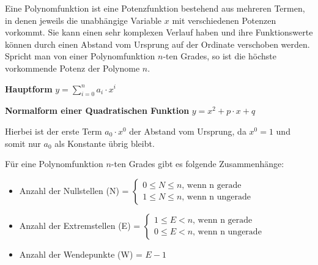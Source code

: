 \begin{figure}[h!]
\centering
\end{figure}


Eine Polynomfunktion ist eine Potenzfunktion bestehend aus mehreren Termen, in denen jeweils die unabh\"{a}ngige Variable $x$ mit verschiedenen Potenzen vorkommt. Sie kann einen sehr komplexen Verlauf haben und ihre Funktionswerte k\"{o}nnen durch einen Abstand vom Ursprung auf der Ordinate verschoben werden.
Spricht man von einer Polynomfunktion $n$-ten Grades, so ist die h\"{o}chste vorkommende Potenz der Polynome $n$.

\textbf{Hauptform}  $y = \sum_{i=0}^{n} a_{i} \cdot x^i$

\textbf{Normalform einer Quadratischen Funktion}  $y = x^2 + p \cdot x + q$

Hierbei ist der erste Term $a_{0} \cdot x^0$ der Abstand vom Ursprung, da $x^0 = 1$ und somit nur $a_{0}$ als Konstante \"{u}brig bleibt.

F\"{u}r eine Polynomfunktion $n$-ten Grades gibt es folgende Zusammenh\"{a}nge:

\begin{itemize}
	\item Anzahl der Nullstellen (N) =
	      $\begin{cases}
	      	0 \leq N \leq n\text{, wenn n gerade}\\
	      	1 \leq N \leq n\text{, wenn n ungerade}
	      \end{cases}$
	\item Anzahl der Extremstellen (E) = 
		$\begin{cases}
			1 \leq E < n\text{, wenn n gerade}\\
	      	0 \leq E < n\text{, wenn n ungerade}
		 \end{cases}$
	\item Anzahl der Wendepunkte (W) = $E - 1$
\end{itemize}

